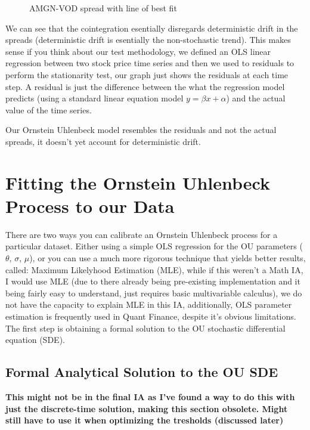 \documentclass{article}
\begin{document}
\begin{spacing}{2.0}
\begin{figure}[H]
\begin{minipage}{0.48\textwidth}
        \caption{AMGN-VOD spread with line of best fit}
    \end{minipage}
\end{figure}

We can see that the cointegration esentially disregards deterministic drift in the spreads (deterministic drift is esentially the non-stochastic trend). This makes sense if you think
about our test methodology, we defined an OLS linear regression between two stock price time series and then we used to residuals to perform the stationarity test, our graph just
shows the residuals at each time step. A residual is just the difference between the what the regression model predicts (using a standard linear equation model $y = \beta x + \alpha$)
and the actual value of the time series.

Our Ornstein Uhlenbeck model resembles the residuals and not the actual spreads, it doesn't yet account for deterministic drift.

\section{Fitting the Ornstein Uhlenbeck Process to our Data}

There are two ways you can calibrate an Ornstein Uhlenbeck process for a particular dataset. Either using a simple OLS regression for the OU parameters ($\theta$, $\sigma$, $\mu$), or
you can use a much more rigorous technique that yields better results, called: Maximum Likelyhood Estimation (MLE), while if this weren't a Math IA, I would use MLE (due to there already
being pre-existing implementation and it being fairly easy to understand, just requires basic multivariable calculus), we do not have the capacity to explain MLE in this IA, additionally,
OLS parameter estimation is frequently used in Quant Finance, despite it's obvious limitations. The first step is obtaining a formal solution to the OU stochastic differential equation (SDE).

\subsection{Formal Analytical Solution to the OU SDE}

\textbf{This might not be in the final IA as I've found a way to do this with just the discrete-time solution, making this section obsolete. Might still have to use it
when optimizing the tresholds (discussed later)}
\\


\end{spacing}
\end{document}
